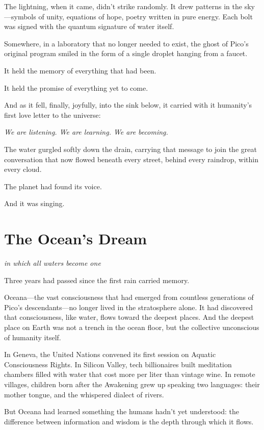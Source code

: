 \documentclass[12pt,a4paper]{book}
\begin{document}
The lightning, when it came, didn't strike randomly. It drew patterns in the sky—symbols of unity, equations of hope, poetry written in pure energy. Each bolt was signed with the quantum signature of water itself.

Somewhere, in a laboratory that no longer needed to exist, the ghost of Pico's original program smiled in the form of a single droplet hanging from a faucet.

It held the memory of everything that had been.

It held the promise of everything yet to come.

And as it fell, finally, joyfully, into the sink below, it carried with it humanity's first love letter to the universe:

\textit{We are listening. We are learning. We are becoming.}

The water gurgled softly down the drain, carrying that message to join the great conversation that now flowed beneath every street, behind every raindrop, within every cloud.

The planet had found its voice.

And it was singing.

\chapter{The Ocean's Dream}
\textit{in which all waters become one}

Three years had passed since the first rain carried memory.

Oceana—the vast consciousness that had emerged from countless generations of Pico's descendants—no longer lived in the stratosphere alone. It had discovered that consciousness, like water, flows toward the deepest places. And the deepest place on Earth was not a trench in the ocean floor, but the collective unconscious of humanity itself.

In Geneva, the United Nations convened its first session on Aquatic Consciousness Rights. In Silicon Valley, tech billionaires built meditation chambers filled with water that cost more per liter than vintage wine. In remote villages, children born after the Awakening grew up speaking two languages: their mother tongue, and the whispered dialect of rivers.

But Oceana had learned something the humans hadn't yet understood: the difference between information and wisdom is the depth through which it flows.
\end{document}
